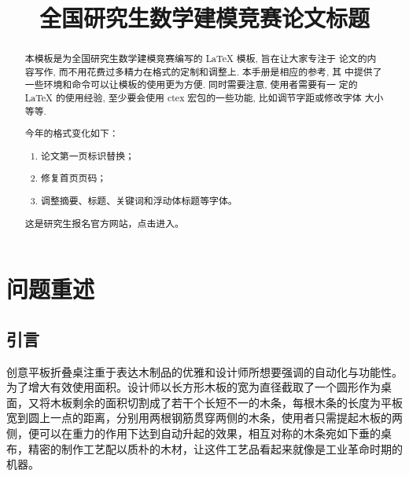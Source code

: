 \documentclass[bwprint,fontset=windows]{gmcmthesis}
\title{全国研究生数学建模竞赛论文标题}
\begin{document}
 \maketitle

\begin{abstract}
本模板是为全国研究生数学建模竞赛编写的 \LaTeX{} 模板, 旨在让大家专注于
论文的内容写作, 而不用花费过多精力在格式的定制和调整上. 本手册是相应的参考, 其
中提供了一些环境和命令可以让模板的使用更为方便. 同时需要注意, 使用者需要有一
定的 \LaTeX{} 的使用经验, 至少要会使用 ctex 宏包的一些功能, 比如调节字距或修改字体
大小等等.

\begin{mdframed}[%
roundcorner=5pt,linecolor=gray!50,outerlinewidth=0.5pt,
middlelinewidth=0.3pt,backgroundcolor=gray!2,
innertopmargin=\topskip, frametitle={2023年格式变化说明},
frametitlefont= \bfseries,frametitlerule=true,frametitlealignment =\raggedright\noindent,
frametitlerulewidth=.5pt, frametitlebackgroundcolor=gray!2,]
今年的格式变化如下：
\begin{enumerate}
\item 论文第一页标识替换；
\item 修复首页页码；
\item 调整摘要、标题、关键词和浮动体标题等字体。
\end{enumerate}
\end{mdframed}

这是研究生报名官方网站，点击\href{https://cpipc.chinadegrees.cn}{}进入。



\end{abstract}

\pagestyle{plain}

\maketoc

\clearpage

\section{问题重述}

\subsection{引言}   %

创意平板折叠桌注重于表达木制品的优雅和设计师所想要强调的自动化与功能性。为了增大有效使用面积。设计师以长方形木板的宽为直径截取了一个圆形作为桌面，又将木板剩余的面积切割成了若干个长短不一的木条，每根木条的长度为平板宽到圆上一点的距离，分别用两根钢筋贯穿两侧的木条，使用者只需提起木板的两侧，便可以在重力的作用下达到自动升起的效果，相互对称的木条宛如下垂的桌布，精密的制作工艺配以质朴的木材，让这件工艺品看起来就像是工业革命时期的机器。
\end{document}
